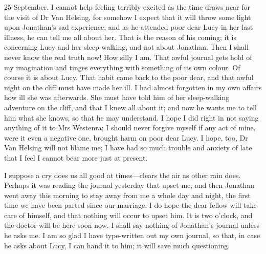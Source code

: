 \begin{diary}{25 September.}
I cannot help feeling terribly excited as the time draws near for the visit of Dr Van Helsing, for somehow I expect that it will throw some light upon Jonathan's sad experience; and as he attended poor dear Lucy in her last illness, he can tell me all about her. That is the reason of his coming; it is concerning Lucy and her sleep-walking, and not about Jonathan. Then I shall never know the real truth now! How silly I am. That awful journal gets hold of my imagination and tinges everything with something of its own colour. Of course it is about Lucy. That habit came back to the poor dear, and that awful night on the cliff must have made her ill. I had almost forgotten in my own affairs how ill she was afterwards. She must have told him of her sleep-walking adventure on the cliff, and that I knew all about it; and now he wants me to tell him what she knows, so that he may understand. I hope I did right in not saying anything of it to Mrs Westenra; I should never forgive myself if any act of mine, were it even a negative one, brought harm on poor dear Lucy. I hope, too, Dr Van Helsing will not blame me; I have had so much trouble and anxiety of late that I feel I cannot bear more just at present.

I suppose a cry does us all good at times—clears the air as other rain does. Perhaps it was reading the journal yesterday that upset me, and then Jonathan went away this morning to stay away from me a whole day and night, the first time we have been parted since our marriage. I do hope the dear fellow will take care of himself, and that nothing will occur to upset him. It is two o'clock, and the doctor will be here soon now. I shall say nothing of Jonathan's journal unless he asks me. I am so glad I have type-written out my own journal, so that, in case he asks about Lucy, I can hand it to him; it will save much questioning.
\end{diary}
 

